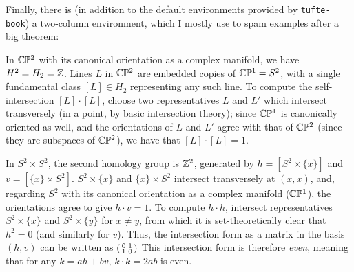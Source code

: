 \documentclass[justified, nofonts, notitlepage, openany, debug]{tufte-book}
\begin{document}
Finally, there is (in addition to the default environments provided by \texttt{tufte-book}) a two-column environment, which I mostly use to spam examples after a big theorem:
\begin{twocol}
\begin{example}
    In $\mathbb{C} \mathbb{P}^2$ with its canonical orientation as a complex manifold, we have $H^2 = H_2 = \mathbb{Z}$. Lines $L$ in $\mathbb{C} \mathbb{P}^2$ are embedded copies of $\mathbb{C} \mathbb{P}^1 = S^2$, with a single fundamental class $[L] \in H_2$ representing any such line. To compute the self-intersection $[L] \cdot [L]$, choose two representatives $L$ and $L'$ which intersect transversely (in a point, by basic intersection theory); since $\mathbb{C} \mathbb{P}^1$ is canonically oriented as well, and the orientations of $L$ and $L'$ agree with that of $\mathbb{C} \mathbb{P}^2$ (since they are subspaces of $\mathbb{C} \mathbb{P}^2$), we have that $[L] \cdot [L] = 1$. 
\end{example}
\begin{example}
    In $S^2 \times S^2$, the second homology group is $\mathbb{Z}^2$, generated by $h = [S^2 \times \{x\}]$ and $v = [\{x\} \times S^2]$. $S^2 \times \{x\}$ and $\{x\} \times S^2$ intersect transversely at $(x,x)$, and, regarding $S^2$ with its canonical orientation as a complex manifold ($\mathbb{C} \mathbb{P}^1$), the orientations agree to give $h \cdot v = 1$. To compute $h \cdot h$, intersect representatives $S^2 \times \{x\}$ and $S^2 \times \{y\}$ for $x \neq y$, from which it is set-theoretically clear that $h^2 = 0$ (and similarly for $v$). Thus, the intersection form as a matrix in the basis $(h,v)$ can be written as $\begin{psmallmatrix} 0 & 1 \\ 1 & 0 \end{psmallmatrix}$ This intersection form is therefore \textit{even}, meaning that for any $k = ah+bv$, $k \cdot k = 2ab$ is even.
\end{example}
\end{twocol}

\nocite{*} %



\end{document}
